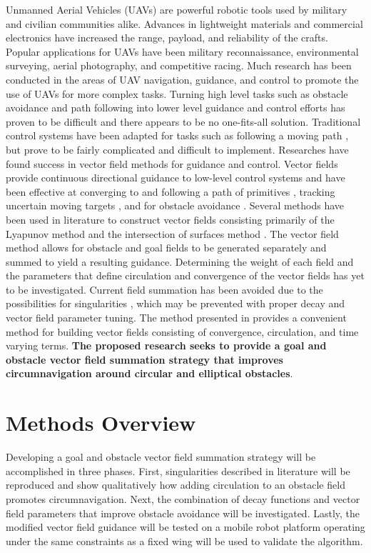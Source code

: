 \documentclass[numbered,pdftex]{ohio-etd}
\begin{document}
Unmanned Aerial Vehicles (UAVs) are powerful robotic tools used by military and civilian communities alike. Advances in lightweight materials and commercial electronics have increased the range, payload, and reliability of the crafts. Popular applications for UAVs have been military reconnaissance, environmental surveying, aerial photography, and competitive racing. Much research has been conducted in the areas of UAV navigation, guidance, and control to promote the use of UAVs for more complex tasks. Turning high level tasks such as obstacle avoidance and path following into lower level guidance and control efforts has proven to be difficult and there appears to be no one-fits-all solution. Traditional control systems have been adapted for tasks such as following a moving path \cite{oliveira_moving_2016}, but prove to be fairly complicated and difficult to implement. Researches have found success in vector field methods for guidance and control. Vector fields provide continuous directional guidance to low-level control systems and have been effective at converging to and following a path of primitives \cite{nelson_cooperative_2005}, tracking uncertain moving targets \cite{chen_tracking_2009}, and for obstacle avoidance \cite{chen_uav_2013}. Several methods have been used in literature to construct vector fields consisting primarily of the Lyapunov method \cite{nelson_cooperative_2005}\cite{griffiths_vector_2006}\cite{frew_cooperative_2007}\cite{frew_lyapunov_nodate}  and the intersection of surfaces method \cite{goncalves_artificial_2009}. The vector field method allows for obstacle and goal fields to be generated separately and summed to yield a resulting guidance. Determining the weight of each field and the parameters that define circulation and convergence of the vector fields has yet to be investigated. Current field summation has been avoided due to the possibilities for singularities \cite{nelson_cooperative_2005}, which may be prevented with proper decay and vector field parameter tuning. The method presented in \cite{goncalves_artificial_2009} provides a convenient method for building vector fields consisting of convergence, circulation, and time varying terms. \textbf{The proposed research seeks to provide a goal and obstacle vector field summation strategy that improves circumnavigation around circular and elliptical obstacles}. 


\section{Methods Overview}
Developing a goal and obstacle vector field summation strategy will be accomplished in three phases. First, singularities described in literature will be reproduced and show qualitatively how adding circulation to an obstacle field promotes circumnavigation. Next, the combination of decay functions and vector field parameters that improve obstacle avoidance will be investigated. Lastly, the modified vector field guidance will be tested on a mobile robot platform operating under the same constraints as a fixed wing will be used to validate the algorithm. 
\end{document}
